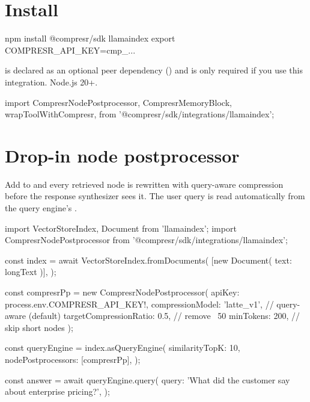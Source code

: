 \documentclass[10pt]{article}
\begin{document}

\section{Install}

\begin{shcode}
npm install @compresr/sdk llamaindex
export COMPRESR_API_KEY=cmp_...
\end{shcode}

 is declared as an optional peer dependency
() and is only required if you use this
integration. Node.js 20+.

\begin{tscode}
import {
  CompresrNodePostprocessor,
  CompresrMemoryBlock,
  wrapToolWithCompresr,
} from '@compresr/sdk/integrations/llamaindex';
\end{tscode}

\section{Drop-in node postprocessor}

Add  to
 and every retrieved node is rewritten
with query-aware compression before the response synthesizer sees it.
The user query is read automatically from the query engine's
.

\begin{tscode}
import { VectorStoreIndex, Document } from 'llamaindex';
import { CompresrNodePostprocessor }
  from '@compresr/sdk/integrations/llamaindex';

const index = await VectorStoreIndex.fromDocuments(
  [new Document({ text: longText })],
);

const compresrPp = new CompresrNodePostprocessor({
  apiKey: process.env.COMPRESR_API_KEY!,
  compressionModel: 'latte_v1',     // query-aware (default)
  targetCompressionRatio: 0.5,      // remove ~50%
  minTokens: 200,                   // skip short nodes
});

const queryEngine = index.asQueryEngine({
  similarityTopK: 10,
  nodePostprocessors: [compresrPp],
});

const answer = await queryEngine.query({
  query: 'What did the customer say about enterprise pricing?',
});
\end{tscode}
\end{document}
